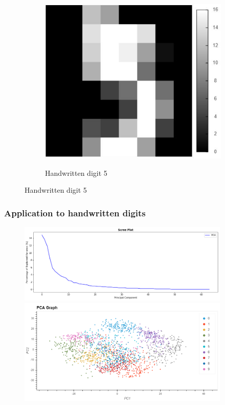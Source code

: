 \documentclass{beamer}
\theoremstyle{plain}
\theoremstyle{definition}
\begin{document}
\begin{frame}
\begin{figure}
\begin{subfigure}{0.45\textwidth}
	\includegraphics[width = \textwidth]{figures/handwritten_digits_dataset_5.jpg}
	\label{pca_example_rotated}
	\caption{Handwritten digit 5}
	\end{subfigure}

\label{pca_example}
\end{figure}
\end{frame}

\begin{frame}
\frametitle{Application to handwritten digits}
\begin{figure}
\centering
\includegraphics[width = 0.9\textwidth]{figures/pca_handwritten_digits_scree.png}
\includegraphics[width = 0.9\textwidth]{figures/pca_handwritten_digits.png}
\end{figure}
\end{frame}
\end{document}
